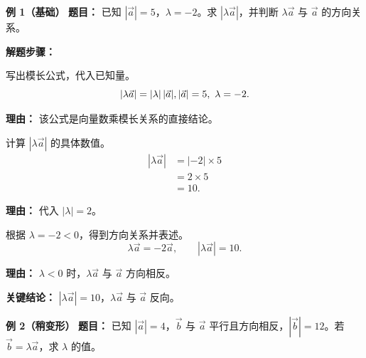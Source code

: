\begin{examplebox}
	\textbf{\textcolor{CExample}{例 1（基础）}}
	\textbf{\textcolor{CExample}{题目：}}
	已知 $|\vec{a}|=5$，$\lambda=-2$。求 $|\lambda\vec{a}|$，并判断 $\lambda\vec{a}$ 与 $\vec{a}$ 的方向关系。

	\textbf{\textcolor{CExample}{解题步骤：}}
	\begin{description}[style=nextline, leftmargin=2.8em, labelsep=0.5em, itemsep=0.45em]
		\item[\textbf{第一步（条件代入）：}]
		      写出模长公式，代入已知量。
		      \[
			      |\lambda\vec{a}| = |\lambda|\,|\vec{a}|,\\ |\vec{a}|=5,\ \lambda=-2.
		      \]
		      \par\textbf{理由：} 该公式是向量数乘模长关系的直接结论。
		\item[\textbf{第二步（模长计算）：}]
		      计算 $|\lambda\vec{a}|$ 的具体数值。
		      \[
			      \begin{aligned}
				      |\lambda\vec{a}|
				       & = |-2|\times 5 \\
				       & = 2\times 5    \\
				       & = 10.
			      \end{aligned}
		      \]
		      \par\textbf{理由：} 代入 $|\lambda|=2$。
		\item[\textbf{第三步（方向结论）：}]
		      根据 $\lambda=-2<0$，得到方向关系并表述。
		      \[
			      \lambda\vec{a} = -2\vec{a},\qquad |\lambda\vec{a}|=10.
		      \]
		      \par\textbf{理由：} $\lambda<0$ 时，$\lambda\vec{a}$ 与 $\vec{a}$ 方向相反。
	\end{description}
	\textbf{\textcolor{CExample}{关键结论：}}
	$|\lambda\vec{a}|=10$，$\lambda\vec{a}$ 与 $\vec{a}$ 反向。

	\medskip
	\textbf{\textcolor{CExample}{例 2（稍变形）}}
	\textbf{\textcolor{CExample}{题目：}}
	已知 $|\vec{a}|=4$，$\vec{b}$ 与 $\vec{a}$ 平行且方向相反，$|\vec{b}|=12$。若 $\vec{b}=\lambda\vec{a}$，求 $\lambda$ 的值。


\end{examplebox}
